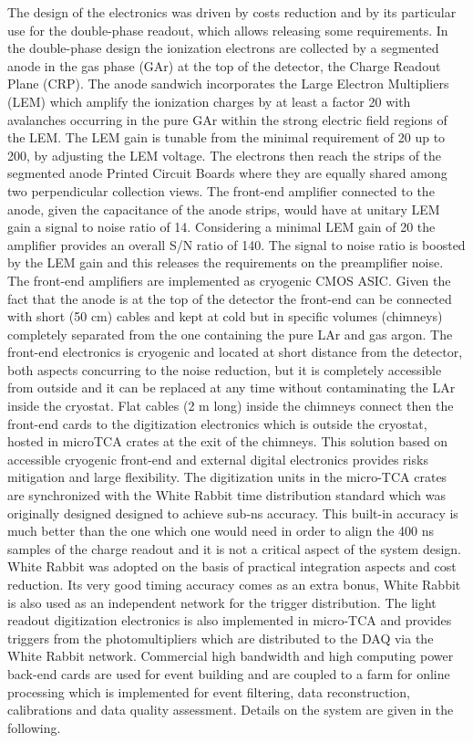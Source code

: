 The design of the electronics was driven by costs reduction and by its particular use for the double-phase readout, which allows releasing some requirements. In the double-phase design the ionization electrons are collected by a segmented anode in the gas phase (GAr) at the top of the detector, the Charge Readout Plane (CRP). The anode sandwich incorporates the Large Electron Multipliers (LEM) which amplify the ionization charges by at least a factor 20 with avalanches occurring in the pure GAr within the strong electric field regions of the LEM. The LEM gain is tunable from the minimal requirement of 20 up to 200, by adjusting the LEM voltage. The electrons then reach the strips of the segmented anode Printed Circuit Boards where they are equally shared among two perpendicular collection views. The front-end amplifier connected to  the anode, given the capacitance of the anode strips, would have at unitary LEM gain a signal to noise ratio of 14. Considering a minimal LEM gain of 20  the amplifier provides an overall S/N ratio of 140. The signal to noise ratio is boosted by the LEM gain and this releases the requirements on the preamplifier noise. The front-end amplifiers are implemented as cryogenic CMOS ASIC. Given the fact that the anode is at the top of the detector the front-end can be connected with short (50 cm) cables and kept at cold but in specific volumes (chimneys) completely separated from the one containing the pure LAr and gas argon. The front-end electronics is cryogenic and located at short distance from the detector, both aspects concurring to the noise reduction, but it is completely accessible from outside and it can be replaced at any time without contaminating the LAr inside the cryostat. Flat cables (2 m long)  inside the chimneys connect then the front-end cards to the digitization electronics which is outside the cryostat, hosted in microTCA crates at the exit of the chimneys. This solution based on accessible cryogenic front-end and external digital electronics provides risks mitigation and large flexibility. The digitization units in the micro-TCA crates are synchronized with the White Rabbit time distribution standard which was originally designed designed to achieve sub-ns accuracy. This built-in accuracy is much better than the one which one would need in order to align the 400 ns samples of the charge readout and it is not a critical aspect of the system design. White Rabbit was adopted on the basis of practical integration aspects and cost reduction. Its very good timing accuracy comes as an extra bonus, White Rabbit is also used as an independent network for the trigger distribution. The light readout digitization electronics is also implemented in micro-TCA and provides triggers from the photomultipliers which are distributed to the DAQ via the White Rabbit network. Commercial high bandwidth and high computing power back-end cards are used for event building and are coupled to a farm for online processing which is implemented for event filtering, data reconstruction, calibrations and data quality assessment. Details on the system are given in the following.


